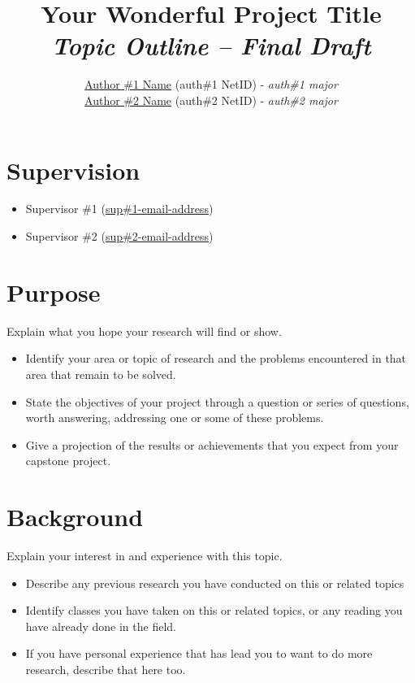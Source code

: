\documentclass{article}
\title{Your Wonderful Project Title\\
        \Large \emph{Topic Outline -- Final Draft}}
\author{\href{mailto:author1@nyu.edu}{Author \#1 Name} (auth\#1 NetID) - \emph{auth\#1 major}\\ \href{mailto:author2@nyu.edu}{Author \#2 Name} (auth\#2 NetID) - \emph{auth\#2 major}}
\date{\vspace{-5ex}} %
\begin{document}
\maketitle
\thispagestyle{firstpage}

\section*{Supervision}

\begin{itemize}
\renewcommand\labelitemi{--}
    \item Supervisor \#1 (\href{mailto:supervisor1@nyu.edu}{sup\#1-email-address})
    \item Supervisor \#2 (\href{mailto:supervisor2@nyu.edu}{sup\#2-email-address})
\end{itemize}


\section*{Purpose}

Explain what you hope your research will find or show.

\begin{itemize}
    \item[--] Identify your area or topic of research and the problems encountered in that area that remain to be solved.

    \item[--] State the objectives of your project through a question or series of questions, worth answering, addressing one or some of these problems. 
    
    \item[--] Give a projection of the results or achievements that you expect from your capstone project.
     
\end{itemize}



\section*{Background}

Explain your interest in and experience with this topic. 

\begin{itemize}
    \item[--] Describe any previous research you have conducted on this or related topics
    \item[--] Identify classes you have taken on this or related topics, or any reading you have already done in the field. 
    \item[--] If you have personal experience that has lead you to want to do more research, describe that here too.
\end{itemize}
\end{document}
